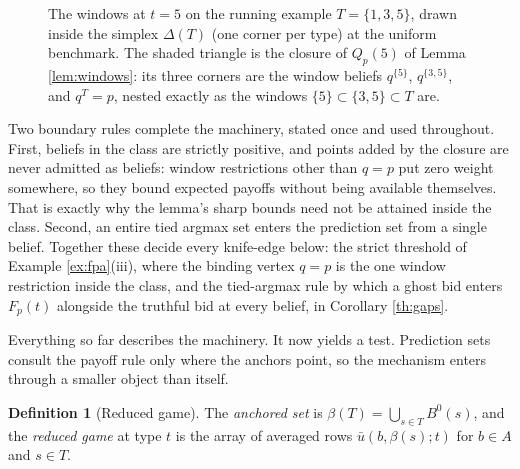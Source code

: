 \documentclass[12pt]{article}
\theoremstyle{definition}
\newtheorem{definition}{Definition}
\begin{document}
\begin{figure}[t]
\centering
{}
\caption{The windows at $t=5$ on the running example $T = \{1,3,5\}$, drawn inside the simplex $\Delta(T)$ (one corner per type) at the uniform benchmark. The shaded triangle is the closure of $Q_p(5)$ of Lemma \ref{lem:windows}: its three corners are the window beliefs $q^{\{5\}}$, $q^{\{3,5\}}$, and $q^{T} = p$, nested exactly as the windows $\{5\} \subset \{3,5\} \subset T$ are.}
\label{fig:windows}
\end{figure}

Two boundary rules complete the machinery, stated once and used throughout. First, beliefs in the class are strictly positive, and points added by the closure are never admitted as beliefs: window restrictions other than $q = p$ put zero weight somewhere, so they bound expected payoffs without being available themselves. That is exactly why the lemma's sharp bounds need not be attained inside the class. Second, an entire tied argmax set enters the prediction set from a single belief. Together these decide every knife-edge below: the strict threshold of Example \ref{ex:fpa}(iii), where the binding vertex $q = p$ is the one window restriction inside the class, and the tied-argmax rule by which a ghost bid enters $F_p(t)$ alongside the truthful bid at every belief, in Corollary \ref{th:gaps}.

Everything so far describes the machinery. It now yields a test. Prediction sets consult the payoff rule only where the anchors point, so the mechanism enters through a smaller object than itself.

\begin{definition}[Reduced game]\label{def:reduced}
The \emph{anchored set} is $\beta(T) = \bigcup_{s \in T} B^0(s)$, and the \emph{reduced game} at type $t$ is the array of averaged rows $\bar u(b, \beta(s); t)$ for $b \in A$ and $s \in T$.
\end{definition}
\end{document}
